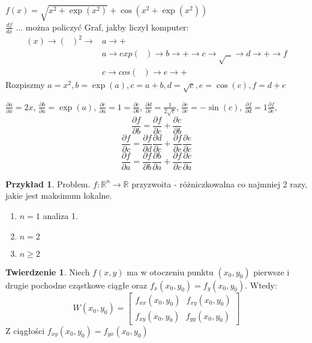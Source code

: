\documentclass{article}
\theoremstyle{definition}
\theoremstyle{definition}
\newtheorem{tw}{Twierdzenie}[subsection]
\theoremstyle{definition}
\newtheorem{pk}{Przykład}[subsection]
\theoremstyle{definition}
\theoremstyle{definition}
\theoremstyle{definition}
\theoremstyle{definition}
\begin{document}
$f(x)=\sqrt{x^2+\exp(x^2)} + \cos(x^2+\exp(x^2))$\\
$\frac{df}{dx}$ ... można policzyć
Graf, jakby liczył komputer:
\begin{align}
    (x) \rightarrow (\text{ })^2 \rightarrow &a \rightarrow +\\
    & a\rightarrow exp(\text{ }) \rightarrow b \rightarrow + \rightarrow c \rightarrow \sqrt{\text{ }}\rightarrow d \rightarrow + \rightarrow f\\
    & c \rightarrow cos(\text{ }) \rightarrow e \rightarrow +
\end{align}
Rozpiszmy $a=x^2, b=\exp(a), c = a+b, d=\sqrt{c}, e=\cos(c), f=d+e$

$\frac{\partial a}{\partial x} = 2x$,
$\frac{\partial b}{\partial a} = \exp(a)$,
$\frac{\partial c}{\partial a} = 1 = \frac{\partial c}{\partial b}$,
$\frac{\partial d}{\partial c} = \frac{1}{2\sqrt{c}}$,
$\frac{\partial e}{\partial c} = -\sin(c)$,
$\frac{\partial f}{\partial d} = 1 \frac{\partial f}{\partial e}$,
\[\frac{\partial f}{\partial b} = \frac{\partial f}{\partial c} + \frac{\partial c}{\partial b}\]
\[\frac{\partial f}{\partial c} = \frac{\partial f}{\partial d}\frac{\partial d}{\partial c} + \frac{\partial f}{\partial e}\frac{\partial e}{\partial c}\]
\[\frac{\partial f}{\partial a} = \frac{\partial f}{\partial b}\frac{\partial b}{\partial a} + \frac{\partial f}{\partial c}\frac{\partial c}{\partial a}\]

\begin{pk}
    Problem. $f: \mathbb{R}^n \rightarrow \mathbb{R}$ przyzwoita - różniczkowalna co najmniej 2 razy, jakie jest maksimum lokalne.
    \begin{enumerate}
        \item $n=1$ analiza 1.
        \item $n=2$
        \item $n\geq 2$
    \end{enumerate}
\end{pk}

\begin{tw}
    Niech $f(x,y)$ ma w otoczeniu punktu $(x_0,y_0)$ pierwsze i drugie pochodne cząstkowe ciągłe oraz $f_x(x_0,y_0)=f_y(x_0,y_0)$. Wtedy:
    \[W(x_0,y_0)= \begin{bmatrix}
        f_{xx} (x_0,y_0)  \text{  }  f_{xy} (x_0,y_0) \\
        f_{xy} (x_0,y_0)  \text{  }  f_{yy} (x_0,y_0) 
        \end{bmatrix}  \]
    Z ciągłości $f_{xy} (x_0,y_0) = f_{yx} (x_0,y_0)$
\end{tw}
\end{document}
